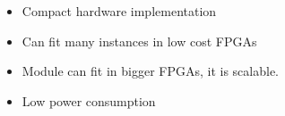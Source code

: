 \begin{itemize}
\item Compact hardware implementation
\item Can fit many instances in low cost FPGAs
\item Module can fit in bigger FPGAs, it is scalable.
\item Low power consumption
\end{itemize}
